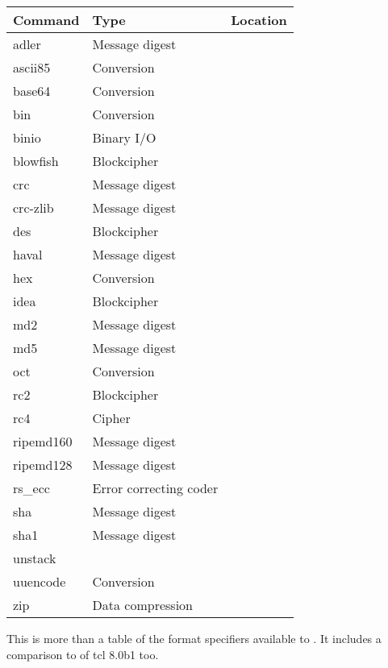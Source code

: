 \documentclass {report}
\begin{document}
\begin {tabular}{|l|l|l|}\hline
	Command		& Type				& Location \\ \hline\hline
	adler		& Message digest		& \zlib	\\ \hline
	ascii85		& Conversion			& \trf	\\ \hline
	base64		& Conversion			& \trf	\\ \hline
	bin		& Conversion			& \trf	\\ \hline
	binio		& Binary I/O			& \trf	\\ \hline
	blowfish	& Blockcipher			& \trf	\\ \hline
	crc		& Message digest		& \trf	\\ \hline
	crc-zlib	& Message digest		& \zlib	\\ \hline
	des		& Blockcipher			& \SSLeay \\ \hline
	haval		& Message digest		& \trf	\\ \hline
	hex		& Conversion			& \trf	\\ \hline
	idea		& Blockcipher			& \trf	\\ \hline
	md2		& Message digest		& \SSLeay \\ \hline
	md5		& Message digest		& \trf	\\ \hline
	oct		& Conversion			& \trf	\\ \hline
	rc2		& Blockcipher			& \SSLeay \\ \hline
	rc4		& Cipher			& \trf	\\ \hline
	ripemd160	& Message digest		& \trf	\\ \hline
	ripemd128	& Message digest		& \trf	\\ \hline
	rs\_ecc		& Error correcting coder	& \trf	\\ \hline
	sha		& Message digest		& \trf	\\ \hline
	sha1		& Message digest		& \SSLeay \\ \hline
	unstack		&				& \trf	\\ \hline
	uuencode	& Conversion			& \trf	\\ \hline
	zip		& Data compression		& \zlib	\\ \hline
\end {tabular}

This is more than a table of the format specifiers available to
. It includes a comparison to  of tcl
8.0b1 too.
\end{document}
